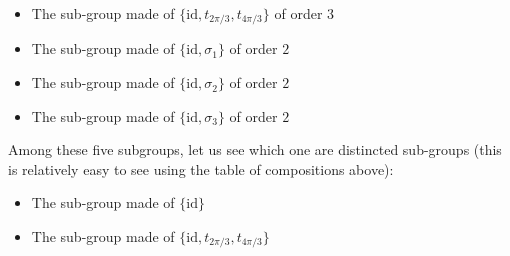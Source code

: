\begin{tcolorbox}[colframe=black,colback=white,sharp corners]
\begin{itemize}
		\item The sub-group made of $\{\text{id},t_{2\pi/3},t_{4\pi/3}\}$ of order $3$

		\item The sub-group made of $\{\text{id},\sigma_1\}$ of order $2$

		\item The sub-group made of $\{\text{id},\sigma_2\}$ of order $2$

		\item The sub-group made of $\{\text{id},\sigma_3\}$ of order $2$
	\end{itemize}
	Among these five subgroups, let us see which one are distincted sub-groups  (this is relatively easy to see using the table of compositions above):
	\begin{itemize}
		\item The sub-group made of $\{\text{id}\}$
	
		\item The sub-group made of $\{\text{id},t_{2\pi/3},t_{4\pi/3}\}$ 
	\end{itemize}
	\end{tcolorbox}
	
